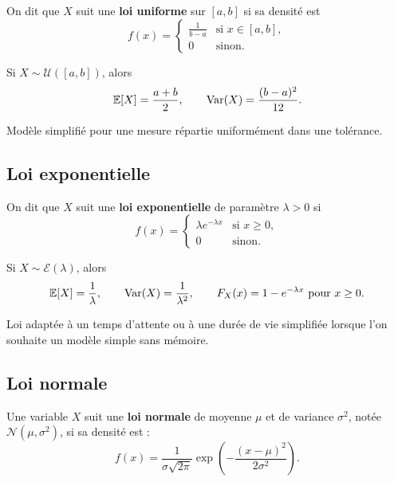 \begin{Def}
On dit que $X$ suit une \textbf{loi uniforme} sur $[a,b]$ si sa densité est
$$
f(x)=
\begin{cases}
\frac{1}{b-a} & \text{si } x\in[a,b],\\
0 & \text{sinon}.
\end{cases}
$$
\end{Def}

\begin{Prop}
Si $X\sim \mathcal{U}([a,b])$, alors
$$
\mathbb{E}[X]=\frac{a+b}{2},
\qquad
\operatorname{Var}(X)=\frac{(b-a)^2}{12}.
$$
\end{Prop}

\begin{Ex}
Modèle simplifié pour une mesure répartie uniformément dans une tolérance.
\end{Ex}

\subsection{Loi exponentielle}

\begin{Def}
On dit que $X$ suit une \textbf{loi exponentielle} de paramètre $\lambda>0$ si
$$
f(x)=
\begin{cases}
\lambda e^{-\lambda x} & \text{si } x\geq 0,\\
0 & \text{sinon}.
\end{cases}
$$
\end{Def}

\begin{Prop}
Si $X\sim \mathcal{E}(\lambda)$, alors
$$
\mathbb{E}[X]=\frac{1}{\lambda},
\qquad
\operatorname{Var}(X)=\frac{1}{\lambda^2},
\qquad
F_X(x)=1-e^{-\lambda x} \ \text{pour } x\geq 0.
$$
\end{Prop}

\begin{Ex}
Loi adaptée à un temps d'attente ou à une durée de vie simplifiée lorsque l'on souhaite un modèle simple sans mémoire.
\end{Ex}

\subsection{Loi normale}

\begin{Def}
Une variable $X$ suit une \textbf{loi normale} de moyenne $\mu$ et de variance $\sigma^2$, notée $\mathcal{N}(\mu,\sigma^2)$, si sa densité est :
$$
f(x)=\frac{1}{\sigma\sqrt{2\pi}}\exp\left(-\frac{(x-\mu)^2}{2\sigma^2}\right).
$$
\end{Def}

